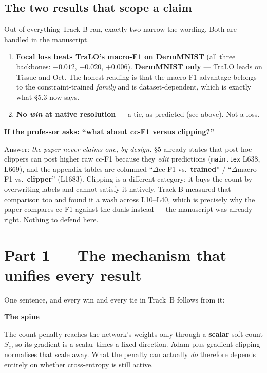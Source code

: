 \documentclass[11pt,a4paper]{article}
\newenvironment{callout}[1]
  {\par\medskip\noindent\begin{lrbox}{\calloutbox}%
   \begin{minipage}{\dimexpr\linewidth-20pt\relax}%
   \textbf{#1}\par\smallskip}
  {\end{minipage}\end{lrbox}%
   \setlength{\fboxsep}{10pt}%
   \colorbox{boxgrey}{\usebox{\calloutbox}}\par\medskip}
\begin{document}
\subsection*{The two results that scope a claim}

Out of everything Track B ran, exactly two narrow the wording. Both are handled in the manuscript.

\begin{enumerate}
\item \textbf{Focal loss beats TraLO's macro-F1 on DermMNIST} (all three backbones: $-0.012$,
      $-0.020$, $+0.006$). \textbf{DermMNIST only} --- TraLO leads on Tissue and Oct. The honest
      reading is that the macro-F1 advantage belongs to the constraint-trained \emph{family} and is
      dataset-dependent, which is exactly what \S5.3 now says.
\item \textbf{No \emph{win} at native resolution} --- a tie, as predicted (see above). Not a loss.
\end{enumerate}

\begin{callout}{If the professor asks: ``what about cc-F1 versus clipping?''}
Answer: \emph{the paper never claims one, by design.} \S5 already states that post-hoc clippers can
post higher raw cc-F1 because they \emph{edit} predictions (\texttt{main.tex} L638, L669), and the
appendix tables are columned ``$\Delta$cc-F1 vs.\ \textbf{trained}'' / ``$\Delta$macro-F1 vs.\
\textbf{clipper}'' (L1683). Clipping is a different category: it buys the count by overwriting
labels and cannot satisfy it natively. Track B measured that comparison too and found it a wash
across L10--L40, which is precisely why the paper compares cc-F1 against the duals instead --- the
manuscript was already right. Nothing to defend here.
\end{callout}

\section*{Part 1 --- The mechanism that unifies every result}

One sentence, and every win and every tie in Track~B follows from it:

\begin{callout}{The spine}
The count penalty reaches the network's weights only through a \textbf{scalar} soft-count $S_c$, so
its gradient is a scalar times a fixed direction. Adam plus gradient clipping normalises that scale
away. What the penalty can actually \emph{do} therefore depends entirely on whether cross-entropy is
still active.
\end{callout}
\end{document}

